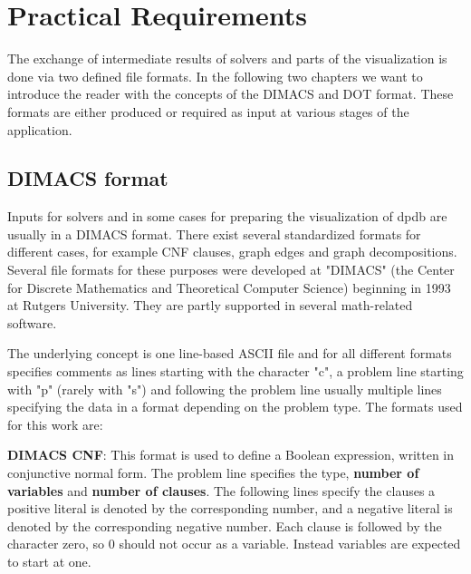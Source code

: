 \documentclass[a4paper, 12pt, bibliography=totoc]{scrartcl}
\begin{document}

\newpage
\section{Practical Requirements}\label{sec:practicalreq}
The exchange of intermediate results of solvers and parts of the visualization is done via two defined file formats. In the following two chapters we want to introduce the reader with the concepts of the DIMACS and DOT format. These formats are either produced or required as input at various stages of the application.
  
\subsection{DIMACS format}

Inputs for solvers and in some cases for preparing the visualization of dpdb are usually in a DIMACS format. There exist several standardized formats for different cases, for example CNF clauses, graph edges and graph decompositions.
Several file formats for these purposes were developed at "DIMACS" (the Center for Discrete Mathematics and Theoretical Computer Science) \cite{dimacsimplcha} beginning in 1993 at Rutgers University.
They are partly supported in several math-related software.

The underlying concept is one line-based ASCII file and for all different formats specifies comments as lines starting with the character "c", a problem line starting with "p" (rarely with "s") and following the problem line usually multiple lines specifying the data in a format depending on the problem type.
The formats used for this work are:

\textbf{DIMACS CNF}: This format is used to define a Boolean expression, written in conjunctive normal form. The problem line specifies the type, \textbf{number of variables} and \textbf{number of clauses}. The following lines specify the clauses a positive literal is denoted by the corresponding number, and a negative literal is denoted by the corresponding negative number. Each clause is followed by the character zero, so 0 should not occur as a variable. Instead variables are expected to start at one.\\
\end{document}
